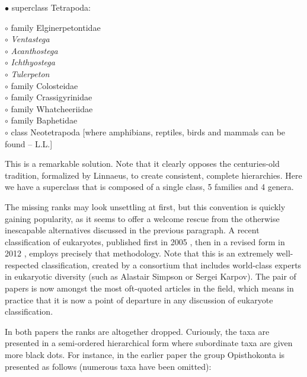 \begin{artengenv}
\pagebreak%
\noindent$\bullet$ superclass Tetrapoda:
\begin{addmargin}[1em]{0em}
 $\circ$ family Elginerpetontidae\\
 $\circ$ \textit{Ventastega}\\
 $\circ$ \textit{Acanthostega}\\
 $\circ$ \textit{Ichthyostega}\\
 $\circ$ \textit{Tulerpeton}\\
 $\circ$ family Colosteidae\\
 $\circ$ family Crassigyrinidae\\
 $\circ$ family Whatcheeriidae\\
 $\circ$ family Baphetidae\\
 $\circ$ class Neotetrapoda [where amphibians, reptiles, birds and mammals can be found -- L.L.]
\end{addmargin}

This is a remarkable solution. Note that it clearly opposes the centuries-old tradition, formalized by Linnaeus, to
create consistent, complete hierarchies. Here we have a superclass that is composed of a single class, 5 families and 4
genera.

The missing ranks may look unsettling at first, but this convention is quickly gaining popularity, as it seems to offer
a welcome rescue from the otherwise inescapable alternatives discussed in the previous paragraph. A recent
classification of eukaryotes, published first in 2005
\parencite{adl_new_2005},
then in a revised
form in 2012
\parencite{adl_revised_2012},
employs precisely that methodology. Note that this is an
extremely well-respected classification, created by a consortium that includes world-class experts in eukaryotic
diversity (such as Alastair Simpson or Sergei Karpov). The pair of papers is now amongst the most oft-quoted articles
in the field, which means in practice that it is now a point of departure in any discussion of eukaryote
classification.

In both papers the ranks are altogether dropped. Curiously, the taxa are presented in a semi-ordered hierarchical form
where subordinate taxa are given more black dots. For instance, in the earlier paper
\parencite{adl_new_2005}
the group Opisthokonta is presented as follows (numerous taxa have been omitted):


\end{artengenv}
